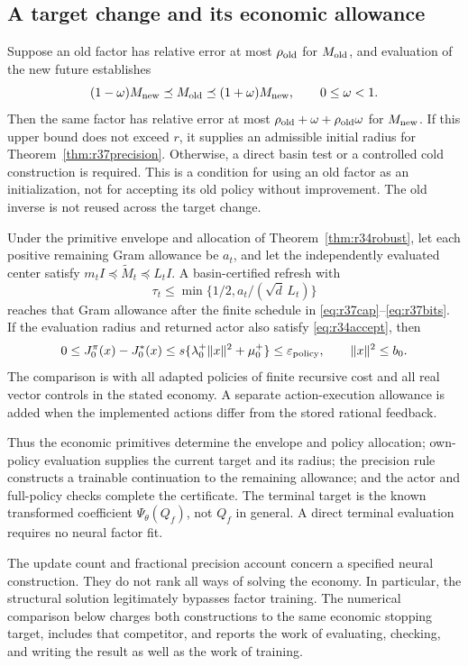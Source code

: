 \subsection{A target change and its economic allowance}
Suppose an old factor has relative error at most $\rho_{\rm old}$ for
$M_{\rm old}$, and evaluation of the new future establishes
\[
 (1-\omega)M_{\rm new}\preceq M_{\rm old}
                \preceq(1+\omega)M_{\rm new},\qquad 0\leq\omega<1.
\]
Then the same factor has relative error at most
$\rho_{\rm old}+\omega+\rho_{\rm old}\omega$ for $M_{\rm new}$. If
this upper bound does not exceed $r$, it supplies an admissible initial
radius for Theorem~\ref{thm:r37precision}. Otherwise, a direct basin test or
a controlled cold construction is required. This is a condition for using
an old factor as an initialization, not for accepting its old policy without
improvement. The old inverse is not reused across the target change.

\begin{corollary}
\label{cor:r37policy}
Under the primitive envelope and allocation of
Theorem~\ref{thm:r34robust}, let each positive remaining Gram allowance be
$a_t$, and let the independently evaluated center satisfy
$m_tI\preceq\widetilde M_t\preceq L_tI$. A basin-certified refresh with
\begin{equation}\label{eq:r37economic}
 \tau_t\leq\min\{1/2,a_t/(\sqrt d\,L_t)\}
\end{equation}
reaches that Gram allowance after the finite schedule in
\eqref{eq:r37cap}--\eqref{eq:r37bits}. If the evaluation radius and returned
actor also satisfy \eqref{eq:r34accept}, then
\[
 0\leq J_0^\pi(x)-J_0^*(x)
       \leq s\{\lambda_0^+\|x\|^2+\mu_0^+\}
       \leq\varepsilon_{\rm policy},\qquad \|x\|^2\leq b_0.
\]
The comparison is with all adapted policies of finite recursive cost and all
real vector controls in the stated economy. A separate action-execution
allowance is added when the implemented actions differ from the stored
rational feedback.
\end{corollary}

Thus the economic primitives determine the envelope and policy allocation;
own-policy evaluation supplies the current target and its radius; the
precision rule constructs a trainable continuation to the remaining
allowance; and the actor and full-policy checks complete the certificate.
The terminal target is the known transformed coefficient
$\Psi_\theta(Q_f)$, not $Q_f$ in general. A direct terminal evaluation
requires no neural factor fit.

The update count and fractional precision account concern a specified neural
construction. They do not rank all ways of solving the economy. In particular,
the structural solution legitimately bypasses factor training. The numerical
comparison below charges both constructions to the same economic stopping
target, includes that competitor, and reports the work of evaluating, checking,
and writing the result as well as the work of training.
